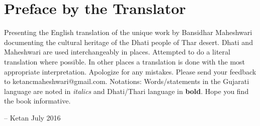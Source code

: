\chapter*{Preface by the Translator}

Presenting the English translation of the unique work by Bansidhar Maheshwari
documenting the cultural heritage of the Dhati people of Thar desert. Dhati and
Maheshwari are used interchangeably in places. Attempted to do a literal
translation where possible. In other places a translation is done with the most
appropriate interpretation. Apologize for any mistakes. Please send your
feedback to ketancmaheshwari@gmail.com. Notations: Words/statements in the
Gujarati language are noted in \textit{italics} and Dhati/Thari language in
\textbf{bold}. Hope you find the book informative.

--
Ketan
July 2016
